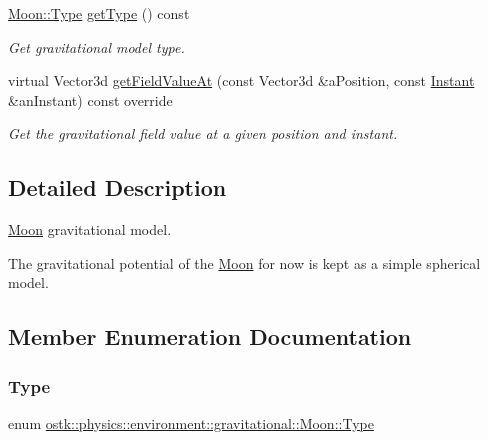 \begin{DoxyCompactItemize}
\hyperlink{classostk_1_1physics_1_1environment_1_1gravitational_1_1_moon_a09ec881799f85fdef3547ef443d57c27}{Moon\+::\+Type} \hyperlink{classostk_1_1physics_1_1environment_1_1gravitational_1_1_moon_a1f58512d7bc337392a7338b90aa213de}{get\+Type} () const
\begin{DoxyCompactList}\small\item\em Get gravitational model type. \end{DoxyCompactList}\item 
virtual Vector3d \hyperlink{classostk_1_1physics_1_1environment_1_1gravitational_1_1_moon_a4771ff76d04a7f850b1bd29b146696ae}{get\+Field\+Value\+At} (const Vector3d \&a\+Position, const \hyperlink{classostk_1_1physics_1_1time_1_1_instant}{Instant} \&an\+Instant) const override
\begin{DoxyCompactList}\small\item\em Get the gravitational field value at a given position and instant. \end{DoxyCompactList}\end{DoxyCompactItemize}


\subsection{Detailed Description}
\hyperlink{classostk_1_1physics_1_1environment_1_1gravitational_1_1_moon}{Moon} gravitational model. 

The gravitational potential of the \hyperlink{classostk_1_1physics_1_1environment_1_1gravitational_1_1_moon}{Moon} for now is kept as a simple spherical model. 

\subsection{Member Enumeration Documentation}
\mbox{\label{classostk_1_1physics_1_1environment_1_1gravitational_1_1_moon_a09ec881799f85fdef3547ef443d57c27}} 
\subsubsection{\texorpdfstring{Type}{Type}}
{\footnotesize\ttfamily enum \hyperlink{classostk_1_1physics_1_1environment_1_1gravitational_1_1_moon_a09ec881799f85fdef3547ef443d57c27}{ostk\+::physics\+::environment\+::gravitational\+::\+Moon\+::\+Type}\hspace{0.3cm}{\ttfamily [strong]}}

